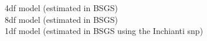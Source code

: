 \documentclass[paper=a4, fontsize=11pt]{scrartcl}         %
\numberwithin{equation}{section}                  %
\numberwithin{figure}{section}                    %
\numberwithin{table}{section}                   %
\begin{document}
4df model (estimated in BSGS) \\
8df model (estimated in BSGS) \\
1df model (estimated in BSGS using the Inchianti snp) \\

















\end{document}
